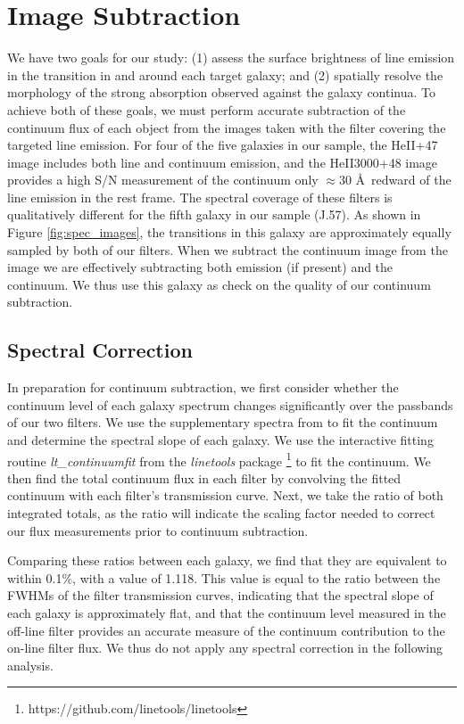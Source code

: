 \documentclass[twocolumn]{aastex62}
\begin{document}
\section{Image Subtraction}\label{sec.cont_sub}
We have two goals for our study: (1) assess the surface brightness of line emission in the  transition in and around each target galaxy; and (2) spatially resolve the morphology of the strong  absorption observed against the galaxy continua.
To achieve both of these goals, we must perform accurate subtraction of the continuum flux of each object from the images taken with the filter covering the targeted line emission. For four of the five galaxies in our sample, the HeII+47 image includes both line and continuum emission, and the HeII3000+48 image provides a high S/N measurement of the continuum only $\approx30$ \AA\ redward of the line emission in the rest frame. %
The spectral coverage of these filters is qualitatively different for the fifth galaxy in our sample (J.57).
As shown in Figure \ref{fig:spec_images}, the  transitions in this galaxy are approximately equally sampled by both of our filters. When we subtract the continuum image from the  image we are effectively subtracting both  emission (if present) and the continuum. We thus use this galaxy as check on the quality of our continuum subtraction.

\subsection{Spectral Correction}
In preparation for continuum subtraction, we first consider whether the continuum level of each galaxy spectrum changes significantly over the passbands of our two filters.
We use the supplementary spectra from \citet{Rubin_2014} to fit the continuum and determine the spectral slope of each galaxy. We use the interactive fitting routine \emph{lt\_continuumfit} from the \emph{linetools} package \citep{Prochaska2016}\footnote{https://github.com/linetools/linetools} to fit the continuum. We then find the total continuum flux in each filter by convolving the fitted continuum with each filter's transmission curve. Next, we take the ratio of both integrated totals, as the ratio will indicate the scaling factor needed to correct our flux measurements prior to continuum subtraction. 

Comparing these ratios between each galaxy, we find that they are equivalent to within 0.1\%, with a value of 1.118. This value is equal to the ratio between the FWHMs of the filter transmission curves, indicating that the spectral slope of each galaxy is approximately flat, and that the continuum level measured in the off-line filter provides an accurate measure of the continuum contribution to the on-line filter flux.  We thus do not apply any spectral correction in the following analysis.
\end{document}
